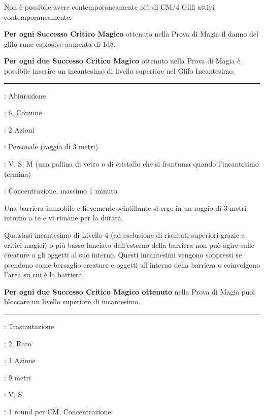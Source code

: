 \begin{multicols}{2}
Non è possibile avere contemporaneamente più di CM/4 Glifi attivi contemporaneamente.

\textbf{Per ogni Successo Critico Magico} ottenuto nella Prova di Magia il danno del glifo rune esplosive aumenta di 1d8.

\textbf{Per ogni due Successo Critico Magico} ottenuto nella Prova di Magia è possibile inserire un incantesimo di livello superiore nel Glifo Incantesimo.

\smallskip\noindent\rule{\linewidth}{2pt} \hypertarget{Globo di Invulnerabilità}{}\smallskip{}
\noindent
\begin{description}[noitemsep, topsep=0pt, parsep=0pt, partopsep=0pt, leftmargin=0cm, labelwidth=2.8cm]
	\item[\textbf{Lista di Magia}]: Abiurazione
	\item[\textbf{Livello}]: 6, Comune
	\item[\textbf{T. di Lancio}]: 2 Azioni
	\item[\textbf{Gittata}]: Personale (raggio di 3 metri)
	\item[\textbf{Componenti}]: V. S, M (una pallina di vetro o di cristallo che si frantuma quando l'incantesimo termina)
	\item[\textbf{Durata}]: Concentrazione, massimo 1 minuto
\end{description}

Una barriera immobile e lievemente scintillante si erge in un raggio di 3 metri intorno a te e vi rimane per la durata.

Qualsiasi incantesimo di Livello 4 (ad esclusione di risultati superiori grazie a critici magici) o più basso lanciato dall'esterno della barriera non può agire sulle creature o gli oggetti al suo interno. Questi incantesimi vengono soppressi se prendono come bersaglio creature e oggetti all'interno della barriera o coinvolgono l'area su cui è la barriera.

\textbf{Per ogni due Successo Critico Magico ottenuto} nella Prova di Magia puoi bloccare un livello superiore di incantesimo.

\smallskip\noindent\rule{\linewidth}{2pt} \hypertarget{Goffaggine}{}\smallskip{}
\noindent
\begin{description}[noitemsep, topsep=0pt, parsep=0pt, partopsep=0pt, leftmargin=0cm, labelwidth=2.8cm]
	\item[\textbf{Lista di Magia}]: Trasmutazione
	\item[\textbf{Livello}]: 2, Raro
	\item[\textbf{T. di Lancio}]: 1 Azione
	\item[\textbf{Gittata}]: 9 metri
	\item[\textbf{Componenti}]: V, S
	\item[\textbf{Durata}]: 1 round per CM, Concentrazione
\end{description}


\end{multicols}
